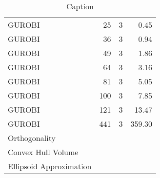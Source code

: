 \documentclass{article}
\begin{document}
\begin{table}[]
\begin{tabular}{lrrr}
			GUROBI                      & 25    & 3         & 0.45      \\
			GUROBI                      & 36    & 3         & 0.94      \\
			GUROBI                      & 49    & 3         & 1.86      \\
			GUROBI                      & 64    & 3         & 3.16      \\
			GUROBI                      & 81    & 3         & 5.05      \\
			GUROBI                      & 100   & 3         & 7.85      \\
			GUROBI                      & 121   & 3         & 13.47     \\
			GUROBI                      & 441   & 3         & 359.30    \\
			
			Orthogonality               &  \\
			Convex Hull Volume          &  \\
			Ellipsoid Approximation     &  \\
			\bottomrule
		\end{tabular}
		\caption{Caption}
		\label{tab:my_label}
	\end{table}
	
		
\end{document}
